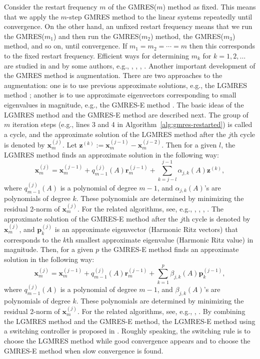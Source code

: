 {Consider the restart frequency $m$ of the GMRES($m$) method as fixed. This means that we apply the $m$-step GMRES method to the linear systems repeatedly until convergence. On the other hand, an unfixed restart frequency means that we run the GMRES($m_1$) and then run the GMRES($m_2$) method, the GMRES($m_3$) method, and so on, until convergence. If $m_1=m_2=\cdots=m$ then this corresponds to the fixed restart frequency.}
{Efficient ways for determining $m_k$ for $k=1,2,\ldots$ are studied in  and by some authors, e.g., , , , .}
{Another important development of the GMRES method is augmentation. There are two approaches to the augmentation: one is to use previous approximate solutions, e.g., the LGMRES method ; another is to use approximate eigenvectors corresponding to small eigenvalues in magnitude, e.g., the GMRES-E method . The basic ideas of the LGMRES method and the GMRES-E method are described next.}
{The group of $m$ iteration steps (e.g., lines 3 and 4 in Algorithm\ \ref{alg:gmres-restarted}) is called a cycle, and the approximate solution of the LGMRES method after the $j$th cycle is denoted by $\bm x_m^{(j)}$. Let $\bm z^{(k)}:=\bm x_m^{(j-1)}-\bm x_m^{(j-2)}$. Then for a given $l$, the LGMRES method finds an approximate solution in the following way:}
\[\bm x_m^{(j)}=\bm x_m^{(j-1)}+q_{m-1}^{(j)}(A)\bm r_m^{(j-1)}+\sum_{k=j-l}^{j-1}\alpha_{j,k}(A)\bm z^{(k)},\]
{where $q_{m-1}^{(j)}(A)$ is a polynomial of degree $m-1$, and $\alpha_{j,k}(A)$'s are polynomials of degree $k$. These polynomials are determined by minimizing the residual 2-norm of $\bm x_m^{(j)}$. For the related algorithms, see, e.g., , , , .}
{The approximate solution of the GMRES-E method after the $j$th cycle is denoted by $\bm x_m^{(j)}$, and $\bm p_k^{(j)}$ is an approximate eigenvector (Harmonic Ritz vectors) that corresponds to the $k$th smallest approximate eigenvalue (Harmonic Ritz value) in magnitude. Then, for a given $p$ the GMRES-E method finds an approximate solution in the following way:}
\[\bm x_m^{(j)}=\bm x_m^{(j-1)}+q_{m-1}^{(j)}(A)\bm r_m^{(j-1)}+\sum_{k=1}^{p}\beta_{j,k}(A)\bm p_k^{(j-1)},\]
{where $q_{m-1}^{(j)}(A)$ is a polynomial of degree $m-1$, and $\beta_{j,k}(A)$'s are polynomials of degree $k$. These polynomials are determined by minimizing the residual 2-norm of $\bm x_m^{(j)}$. For the related algorithms, see, e.g., , . By combining the LGMRES method and the GMRES-E method, the LGMRES-E method using a switching controller is proposed in . Roughly speaking, the switching rule is to choose the LGMRES method while good convergence appears and to choose the GMRES-E method when slow convergence is found.}
